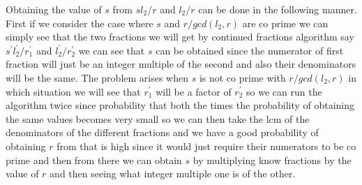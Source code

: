 \documentclass{report}
\begin{document}
Obtaining the value of $s$ from $sl_2/r$ and $l_2/r$ can be done in the following manner. First if we consider the case where $s$ and $r/gcd(l_2,r)$ are co prime we can simply see that the two fractions we will get by continued fractions algorithm say $s^{'}l_2^{'}/r_1^{'}$ and $l_2^{'}/r_2^{'}$ we can see that $s$ can be obtained since the numerator of first fraction will just be an integer multiple of the second and also their denominators will be the same. The problem arises when $s$ is not co prime with $r/gcd(l_2,r)$ in which situation we will see that $r_{1}^{'}$ will be a factor of $r_{2}^{'}$ so we can run the algorithm twice since probability that both the times the probability of obtaining the same values becomes very small so we can then take the lcm of the denominators of the different fractions and we have a good probability of obtaining $r$ from that is high since it would just require their numerators to be co prime and then from there we can obtain $s$ by multiplying know fractions by the value of $r$ and then seeing what integer multiple one is of the other.
\end{document}
